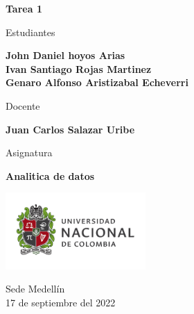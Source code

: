 \begin{titlepage}
   \Large{
   \begin{center}
       \vspace*{1cm}

       \textbf{Tarea 1}

            
       \vspace{1.1cm}
       
       Estudiantes
       
       \vspace{0.5cm}
        
	     \textbf{John Daniel hoyos Arias} \\

       \textbf{Ivan Santiago Rojas Martinez} \\
       
       \textbf{Genaro Alfonso Aristizabal Echeverri}



              \vspace{1cm}
       
       Docente
       
       \vspace{0.5cm}

       \textbf{Juan Carlos Salazar Uribe}
       
       \vspace{0.4cm}

       \vspace{1.4cm}
       
       Asignatura
       
       \vspace{0.5cm}

       \textbf{Analitica de datos}

       \vfill

            
       \vspace{0.4cm}
     
       \includegraphics[width=0.4\textwidth]{DocumentFormat/logounal.png}
            
       Sede Medellín\\
       17 de septiembre del 2022
       
   \end{center}
   }
\end{titlepage}